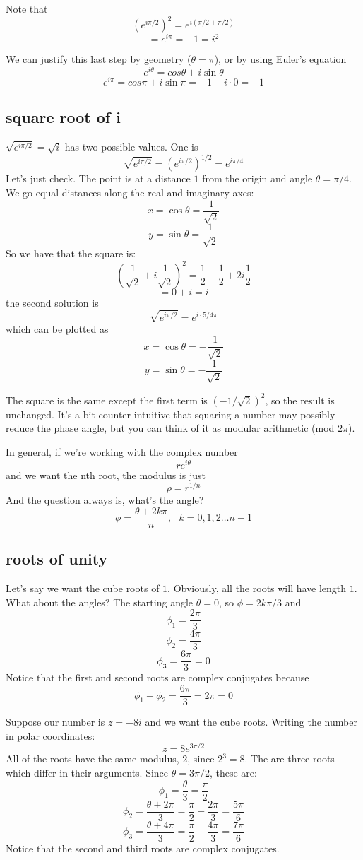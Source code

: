 \documentclass[11pt, oneside]{article}
\begin{document}
Note that
\[ (e^{i \pi/2})^2 = e^{i (\pi/2 + \pi/2)}\]
\[ = e^{i\pi} = -1 = i^2 \]

We can justify this last step by geometry ($\theta = \pi$), or by using Euler's equation
\[ e^{i\theta} = cos \theta + i \sin \theta \]
\[ e^{i\pi} =  cos \pi + i \sin \pi = - 1 + i \cdot 0 = -1 \]

\subsection*{square root of i}

$\sqrt{e^{i \pi/2}} = \sqrt{i}$ has two possible values.  One is
\[ \sqrt{e^{i\pi/2}}  = (e^{i\pi/2})^{1/2} = e^{i\pi/4} \]
Let's just check.  The point is at a distance $1$ from the origin and angle $\theta = \pi/4$.  We go equal distances along the real and imaginary axes:
\[ x = \cos \theta = \frac{1}{\sqrt{2}} \]
\[ y = \sin \theta = \frac{1}{\sqrt{2}} \]
So we have that the square is:
\[ (\frac{1}{\sqrt{2}} + i \frac{1}{\sqrt{2}} )^2 = \frac{1}{2} - \frac{1}{2} + 2 i \frac{1}{2} \]
\[ = 0 + i = i \]
the second solution is
\[ \sqrt{e^{i\pi/2}}  = e^{i \cdot 5/4 \pi} \]
which can be plotted as
\[ x = \cos \theta = -\frac{1}{\sqrt{2}} \]
\[ y = \sin \theta = -\frac{1}{\sqrt{2}} \]

The square is the same except the first term is $(- 1/\sqrt{2})^2$, so the result is unchanged.  It's a bit counter-intuitive that squaring a number may possibly reduce the phase angle, but you can think of it as modular arithmetic (mod $2 \pi$).

In general, if we're working with the complex number
\[ re^{i\theta} \]
and we want the nth root, the modulus is just
\[ \rho = r^{1/n} \]
And the question always is, what's the angle?
\[ \phi = \frac{\theta + 2k\pi}{n}, \ \ \ k = 0, 1, 2 \dots n-1 \]

\subsection*{roots of unity}

Let's say we want the cube roots of $1$.  Obviously, all the roots will have length $1$.  What about the angles?  The starting angle $\theta = 0$, so $\phi = 2k\pi/3$ and 
\[ \phi_ 1= \frac{2 \pi}{3} \]
\[ \phi_2 = \frac{4 \pi}{3} \]
\[ \phi_3 = \frac{6 \pi}{3} = 0 \]
Notice that the first and second roots are complex conjugates because
\[ \phi_1 + \phi_2 = \frac{6\pi}{3} = 2 \pi = 0 \]

Suppose our number is $z = -8i$ and we want the cube roots.  Writing the number in polar coordinates:
\[ z = 8e^{3\pi/2} \]
All of the roots have the same modulus, $2$, since $2^3 = 8$.  The are three roots which differ in their arguments.  Since $\theta = 3 \pi / 2$, these are:
\[ \phi_1 = \frac{\theta}{3} = \frac{\pi}{2} \]
\[ \phi_2 = \frac{\theta + 2\pi}{3} = \frac{\pi}{2} + \frac{2\pi}{3} = \frac{5\pi}{6} \]
\[ \phi_3 = \frac{\theta + 4\pi}{3} = \frac{\pi}{2} + \frac{4\pi}{3} = \frac{7\pi}{6} \]
Notice that the second and third roots are complex conjugates.
\end{document}
